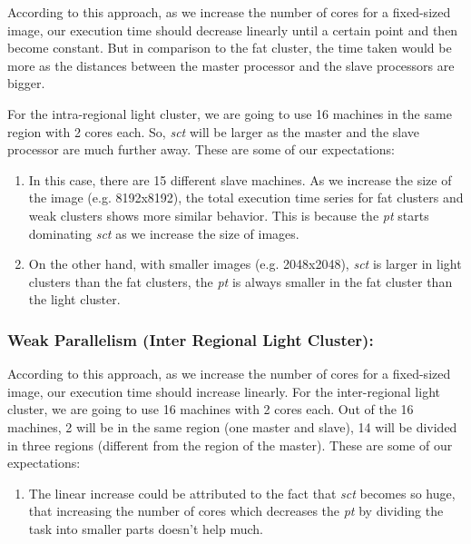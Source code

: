 \documentclass{article}
\begin{document}
According to this approach, as we increase the number of cores for a fixed-sized image, our execution time should decrease linearly until a certain point and then become constant. But in comparison to the fat cluster, the time taken would be more as the distances between the master processor and the slave processors are bigger.

For the intra-regional light cluster, we are going to use 16 machines in the same region with 2 cores each. So, \textit{sct} will be larger as the master and the slave processor are much further away. These are some of our expectations:

\begin{enumerate}
    \item In this case, there are 15 different slave machines. As we increase the size of the image (e.g. 8192x8192), the total execution time series for fat clusters and weak clusters shows more similar behavior. This is because the \textit{pt} starts dominating \textit{sct} as we increase the size of images. \item On the other hand, with smaller images (e.g. 2048x2048), \textit{sct} is larger in light clusters than the fat clusters, the \textit{pt} is always smaller in the fat cluster than the light cluster.

\end{enumerate}

\subsubsection{Weak Parallelism (Inter Regional Light Cluster):}

According to this approach, as we increase the number of cores for a fixed-sized image, our execution time should increase linearly. For the inter-regional light cluster, we are going to use 16 machines with 2 cores each. Out of the 16 machines, 2 will be in the same region (one master and slave), 14 will be divided in three regions (different from the region of the master). These are some of our expectations:

\begin{enumerate}
\item The linear increase could be attributed to the fact that \textit{sct} becomes so huge, that increasing the number of cores which decreases the \textit{pt} by dividing the task into smaller parts doesn’t help much.

\end{enumerate}
\end{document}

